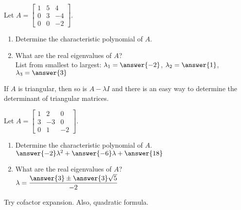 \documentclass{ximera}
\begin{document}
  	  		      \begin{question} Let $A= \begin{bmatrix} 1&5&4 \\0&3&-4\\ 0&0&-2\end{bmatrix}$.\\
  	  		      	
  	  		      	\begin{enumerate}
  	  		      		\item Determine the characteristic polynomial of $A$. \\
  	  		      		
  	  		      		\begin{multipleChoice}
  	  		      			\end{multipleChoice}
  	  		      		
  	  		      		\item What are the real eigenvalues of $A$?\\
  	  		      		
  	  		      		List from smallest to largest: $\lambda_1 = \answer{-2}$, $\lambda_2 = \answer{1}$, $\lambda_3 = \answer{3}$\\
  	  		      	\end{enumerate}
  	  		      	\begin{hint}
  	  		      		If $A$ is triangular, then so is $A-\lambda I$ and there is an easy way to determine the determinant of triangular matrices.
  	  		      		\end{hint}
  	  		      \end{question}	
  	  		      \begin{question} Let $A= \begin{bmatrix} 1&2&0 \\3&-3&0\\ 0&1&-2\end{bmatrix}$.\\
  	  		      	
  	  		      	\begin{enumerate}
  	  		      		\item Determine the characteristic polynomial of $A$. \\
  	  		      		
  	  		      	$\answer{-2}\lambda^2+\answer{-6}\lambda+\answer{18}$\\
  	  		      		
  	  		      		\item What are the real eigenvalues of $A$?\\
  	  		      		
  	  		      	$\lambda = \dfrac{\answer{3}\pm \answer{3}\sqrt{5}}{-2}$
  	  		      	\end{enumerate}
  	  		      	\begin{hint}
  	  		      		Try cofactor expansion. Also, quadratic formula.
  	  		      	\end{hint}
  	  		      \end{question}	
\end{document}
